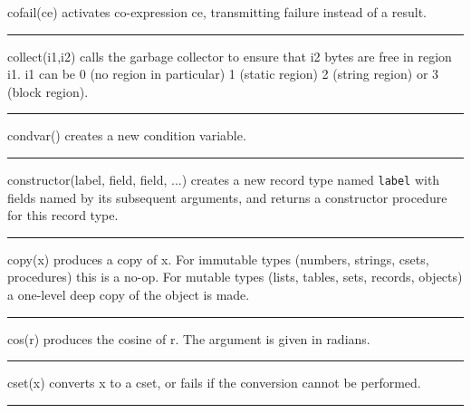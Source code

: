 \noindent
{}cofail(ce) activates
co-expression ce, transmitting failure instead of a result.

\bigskip\hrule\vspace{0.1cm}

\noindent
{}collect(i1,i2) calls the garbage collector to ensure that i2 bytes are free in region
i1. i1 can be 0 (no region in particular) 1 (static region) 2 (string
region) or 3 (block region).

\bigskip\hrule\vspace{0.1cm}

\noindent
{}condvar() creates
a new condition variable.

\bigskip\hrule\vspace{0.1cm}

\noindent
{}constructor(label, field, field, ...) creates
a new record type named \texttt{label} with fields named by its
subsequent arguments, and returns a constructor procedure for this
record type.

\bigskip\hrule\vspace{0.1cm}

\noindent
{}copy(x) produces a copy of x. For immutable types
(numbers, strings, csets, procedures) this is a no-op. For mutable
types (lists, tables, sets, records, objects) a one-level deep copy of
the object is made.

\bigskip\hrule\vspace{0.1cm}

\noindent
{}cos(r) produces the cosine of r. The argument is given in
radians.

\bigskip\hrule\vspace{0.1cm}

\noindent
{}cset(x) converts x to a cset, or fails if the
conversion cannot be performed.

\bigskip\hrule\vspace{0.1cm}

